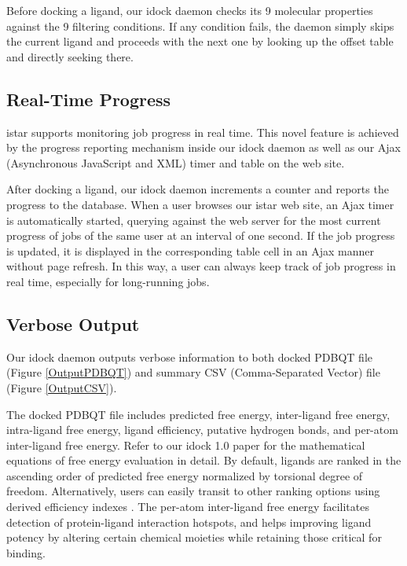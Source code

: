 \documentclass[12pt]{article}
\begin{document}
Before docking a ligand, our idock daemon checks its 9 molecular properties against the 9 filtering conditions. If any condition fails, the daemon simply skips the current ligand and proceeds with the next one by looking up the offset table and directly seeking there.

\subsection*{\sffamily \large Real-Time Progress}

istar supports monitoring job progress in real time. This novel feature is achieved by the progress reporting mechanism inside our idock daemon as well as our Ajax (Asynchronous JavaScript and XML) timer and table on the web site.

After docking a ligand, our idock daemon increments a counter and reports the progress to the database. When a user browses our istar web site, an Ajax timer is automatically started, querying against the web server for the most current progress of jobs of the same user at an interval of one second. If the job progress is updated, it is displayed in the corresponding table cell in an Ajax manner without page refresh. In this way, a user can always keep track of job progress in real time, especially for long-running jobs.

\subsection*{\sffamily \large Verbose Output}

Our idock daemon outputs verbose information to both docked PDBQT file (Figure \ref{OutputPDBQT}) and summary CSV (Comma-Separated Vector) file (Figure \ref{OutputCSV}).

The docked PDBQT file includes predicted free energy, inter-ligand free energy, intra-ligand free energy, ligand efficiency, putative hydrogen bonds, and per-atom inter-ligand free energy. Refer to our idock 1.0 paper \citep{1153} for the mathematical equations of free energy evaluation in detail. By default, ligands are ranked in the ascending order of predicted free energy normalized by torsional degree of freedom. Alternatively, users can easily transit to other ranking options using derived efficiency indexes \citep{335,336,337}. The per-atom inter-ligand free energy facilitates detection of protein-ligand interaction hotspots, and helps improving ligand potency by altering certain chemical moieties while retaining those critical for binding.
\end{document}

